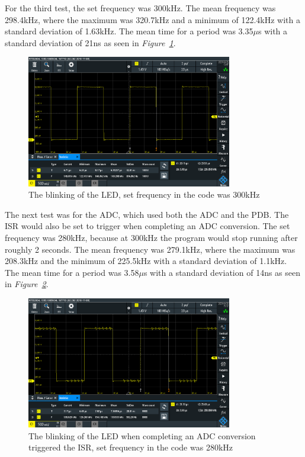 \clearpage

For the third test, the set frequency was 300kHz.
The mean frequency was 298.4kHz, where the maximum was 320.7kHz and a minimum of 122.4kHz with a standard deviation of 1.63kHz. 
The mean time for a period was 3.35$\mu$s with a standard deviation of 21ns as seen in \textit{Figure~\ref{fig:PDBsp300}}.


\begin{figure}[h]
    \centering
    \includegraphics[width=0.8\textwidth]{graphics/STAT03_300.PNG}
    \caption{The blinking of the LED, set frequency in the code was 300kHz}
    \label{fig:PDBsp300}
\end{figure}


The next test was for the ADC, which used both the ADC and the PDB.
The ISR would also be set to trigger when completing an ADC conversion.
The set frequency was 280kHz, because at 300kHz the program would stop running after roughly 2 seconds.
The mean frequency was 279.1kHz, where the maximum was 208.3kHz and the minimum of 225.5kHz with a standard deviation of 1.1kHz. 
The mean time for a period was 3.58$\mu$s with a standard deviation of 14ns as seen in \textit{Figure~\ref{fig:PDBADCDMAsp280}}.

\clearpage

\begin{figure}[h]
    \centering
    \includegraphics[width=0.8\textwidth]{graphics/STATADC_280.PNG}
    \caption{The blinking of the LED when completing an ADC conversion triggered the ISR, set frequency in the code was 280kHz}
    \label{fig:PDBADCDMAsp280}
\end{figure}


